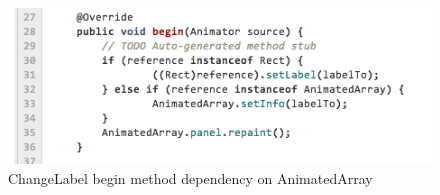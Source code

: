 \begin{figure}
\begin{center}
\includegraphics[width=\textwidth]{images/coupling.png}
\end{center}
\caption{ChangeLabel begin method dependency on AnimatedArray}
\label{fig:coupling}
\end{figure}
